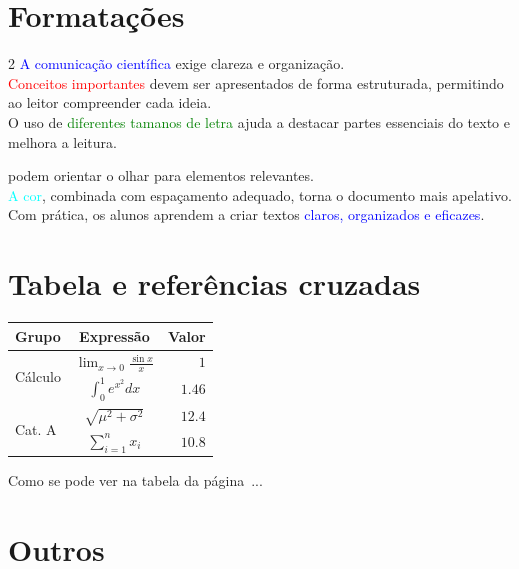 \documentclass[11pt,a4paper]{report}
\begin{document}
\newpage

\section{Formatações}

\begin{multicols}{2}
\noindent
{\Large \textcolor{blue}{A comunicação científica}} exige clareza e organização.\\
\textcolor{red}{\large Conceitos importantes} devem ser apresentados de forma estruturada, permitindo ao leitor compreender cada ideia.\\
O uso de \textcolor{green}{\small diferentes tamanos de letra} ajuda a destacar partes essenciais do texto e melhora a leitura.

\columnbreak
\noindent {\LARGE \textcolor{magenta}{Destaques visuais}} podem orientar o olhar para elementos relevantes.\\
\textcolor{cyan}{\large A cor}, combinada com espaçamento adequado, torna o documento mais apelativo.\\
Com prática, os alunos aprendem a criar textos \textcolor{blue}{\small claros, organizados e eficazes}.
\end{multicols}

\section{Tabela e referências cruzadas}

\begin{table}[h!]
\centering
\begin{tabular}{|l|c|r|}
\hline
\textbf{Grupo} & \textbf{Expressão} & \textbf{Valor}\\
\hline
\multirow{2}{*}{Cálculo} & $\lim_{x \to 0}\frac{\sin x}{x}$ & $1$
\\ \cline{2-3}
& $\int_{0}^{1} e^{x^2} dx$ & $1.46$ \\ \hline

\multirow{2}{*}{Cat. A} & $\sqrt{\mu^2 + \sigma^2}$ & $12.4$ \\ \cline{2-3}
& $\sum_{i=1}^{n} x_i$ & $10.8$ \\ \hline
\end{tabular}
\label{a}
\end{table}
Como se pode ver na tabela da página \pageref{a}\,...

\section{Outros}
\end{document}
